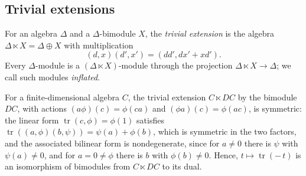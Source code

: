 \subsection{Trivial extensions}
\label{subsec:trivial-extensions}

For an algebra $\Delta$ and a $\Delta$-bimodule $X$, the \emph{trivial
extension} is the algebra ${\Delta\ltimes X=\Delta\oplus X}$ with multiplication
\[
  (d,x)(d',x')=(dd',dx'+xd').
\]
Every $\Delta$-module is a ${(\Delta\ltimes X)}$-module through the projection
${\Delta\ltimes X\to\Delta}$; we call such modules \emph{inflated}.

For a finite-dimensional algebra $C$, the trivial extension ${C\ltimes DC}$ by
the bimodule $DC$, with actions ${(a\phi)(c)=\phi(ca)}$ and ${(\phi a)(c)=
\phi(ac)}$, is symmetric: the linear form ${\operatorname{tr}(c,\phi)=\phi(1)}$
satisfies ${\operatorname{tr}((a,\phi)(b,\psi))=\psi(a)+\phi(b)}$, which is
symmetric in the two factors, and the associated bilinear form is
nondegenerate, since for ${a\neq0}$ there is $\psi$ with ${\psi(a)\neq0}$, and for
${a=0\neq\phi}$ there is $b$ with ${\phi(b)\neq0}$. Hence,
${t\mapsto\operatorname{tr}(-\,t)}$ is an isomorphism of bimodules from
${C\ltimes DC}$ to its dual.
